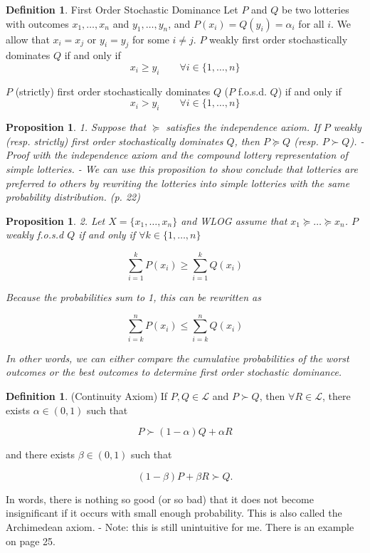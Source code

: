 \documentclass[12pt]{article}
\newtheorem{proposition}[theorem]{Proposition}
\theoremstyle{definition}
\newtheorem{definition}[theorem]{Definition}
\theoremstyle{remark}
\begin{document}
\begin{definition}{First Order Stochastic Dominance}
    Let $P$ and $Q$ be two lotteries with outcomes $x_1, \dots, x_n$ and $y_1, \dots, y_n$, and $P(x_i) = Q(y_i) = \alpha_i$ for all $i$. We allow that $x_i = x_j$ or $y_i = y_j$ for some $i \neq j$. $P$ weakly first order stochastically dominates $Q$ if and only if
    \[
        x_i \geq y_i \qquad \forall i \in \{1, \dots, n\}
    \]

    $P$ (strictly) first order stochastically dominates $Q$ ($P$ f.o.s.d. $Q$) if and only if
    \[
        x_i > y_i \qquad \forall i \in \{1, \dots, n\}
    \]
\end{definition}

\begin{proposition}1. Suppose that $\succeq$ satisfies the independence axiom. If $P$ weakly (resp. strictly) first order stochastically dominates $Q$, then $P \succeq Q$ (resp. $P \succ Q$).
    - Proof with the independence axiom and the compound lottery representation of simple lotteries.
    - We can use this proposition to show conclude that lotteries are preferred to others by rewriting the lotteries into simple lotteries with the same probability distribution. (p. 22)

\end{proposition}

\begin{proposition}2. Let $X = \{x_1, \dots, x_n\}$ and WLOG assume that $x_1 \succeq \dots \succeq x_n$. $P$ weakly f.o.s.d $Q$ if and only if $\forall k \in \{1, \dots, n\}$

    \[
        \sum_{i = 1}^k P(x_i) \geq \sum_{i = 1}^k Q(x_i)
    \]

    Because the probabilities sum to 1, this can be rewritten as

    \[
        \sum_{i = k}^n P(x_i) \leq \sum_{i = k}^n Q(x_i)
    \]

    In other words, we can either compare the cumulative probabilities of the worst outcomes or the best outcomes to determine first order stochastic dominance.

\end{proposition}

\begin{definition}(Continuity Axiom) If $P, Q \in \mathcal{L}$ and $P \succ Q$, then $\forall R \in \mathcal{L}$, there exists $\alpha \in (0, 1)$ such that

    \[
        P \succ (1 - \alpha) Q + \alpha R
    \]

    and there exists $\beta \in (0, 1)$ such that

    \[
        (1 - \beta) P + \beta R \succ Q.
    \]

    In words, there is nothing so good (or so bad) that it does not become insignificant if it occurs with small enough probability. This is also called the Archimedean axiom.
    - Note: this is still unintuitive for me. There is an example on page 25.

\end{definition}
\end{document}
